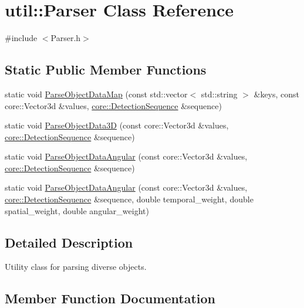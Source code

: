 \hypertarget{classutil_1_1Parser}{}\section{util\+:\+:Parser Class Reference}
\label{classutil_1_1Parser}


{\ttfamily \#include $<$Parser.\+h$>$}

\subsection*{Static Public Member Functions}
\begin{DoxyCompactItemize}
\item 
static void \hyperlink{classutil_1_1Parser_ac2095e8699706079dde135098f30de0a}{Parse\+Object\+Data\+Map} (const std\+::vector$<$ std\+::string $>$ \&keys, const core\+::\+Vector3d \&values, \hyperlink{classcore_1_1DetectionSequence}{core\+::\+Detection\+Sequence} \&sequence)
\item 
static void \hyperlink{classutil_1_1Parser_afbc0421d8672a418284efb5a9b6cec92}{Parse\+Object\+Data3D} (const core\+::\+Vector3d \&values, \hyperlink{classcore_1_1DetectionSequence}{core\+::\+Detection\+Sequence} \&sequence)
\item 
static void \hyperlink{classutil_1_1Parser_a314cfd3ebd16ab18cd132e7d8dd4c04a}{Parse\+Object\+Data\+Angular} (const core\+::\+Vector3d \&values, \hyperlink{classcore_1_1DetectionSequence}{core\+::\+Detection\+Sequence} \&sequence)
\item 
static void \hyperlink{classutil_1_1Parser_a5a4c53339551dbf67bd351fd0fe2c087}{Parse\+Object\+Data\+Angular} (const core\+::\+Vector3d \&values, \hyperlink{classcore_1_1DetectionSequence}{core\+::\+Detection\+Sequence} \&sequence, double temporal\+\_\+weight, double spatial\+\_\+weight, double angular\+\_\+weight)
\end{DoxyCompactItemize}


\subsection{Detailed Description}
Utility class for parsing diverse objects. 

\subsection{Member Function Documentation}
